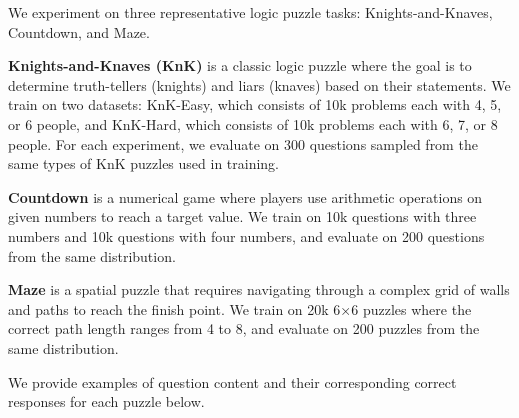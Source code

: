 \documentclass{article}
\theoremstyle{plain}
\theoremstyle{definition}
\theoremstyle{remark}
\begin{document}
\label{app:detail-logic}
We experiment on three representative logic puzzle tasks: Knights-and-Knaves, Countdown, and Maze. 

\textbf{Knights-and-Knaves (KnK)} is a classic logic puzzle where the goal is to determine truth-tellers (knights) and liars (knaves) based on their statements. We train on two datasets: KnK-Easy, which consists of 10k problems each with 4, 5, or 6 people, and KnK-Hard, which consists of 10k problems each with 6, 7, or 8 people. For each experiment, we evaluate on 300 questions sampled from the same types of KnK puzzles used in training.

\textbf{Countdown} is a numerical game where players use arithmetic operations on given numbers to reach a target value. We train on 10k questions with three numbers and 10k questions with four numbers, and evaluate on 200 questions from the same distribution.

\textbf{Maze} is a spatial puzzle that requires navigating through a complex grid of walls and paths to reach the finish point. We train on 20k 6×6 puzzles where the correct path length ranges from 4 to 8, and evaluate on 200 puzzles from the same distribution.

We provide examples of question content and their corresponding correct responses for each puzzle below.
\end{document}
